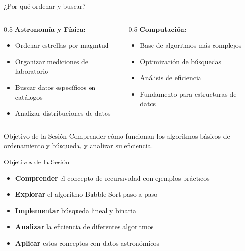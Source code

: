 \documentclass[10pt]{beamer}
\begin{document}
\begin{frame}{¿Por qué ordenar y buscar?}
  \begin{columns}
    \begin{column}{0.5\textwidth}
      \textbf{Astronomía y Física:}
      \begin{itemize}
        \item Ordenar estrellas por magnitud
        \item Organizar mediciones de laboratorio
        \item Buscar datos específicos en catálogos
        \item Analizar distribuciones de datos
      \end{itemize}
    \end{column}
    \begin{column}{0.5\textwidth}
      \textbf{Computación:}
      \begin{itemize}
        \item Base de algoritmos más complejos
        \item Optimización de búsquedas
        \item Análisis de eficiencia
        \item Fundamento para estructuras de datos
      \end{itemize}
    \end{column}
  \end{columns}
  
  \vspace{0.5cm}
  \begin{alertblock}{Objetivo de la Sesión}
    Comprender cómo funcionan los algoritmos básicos de ordenamiento y búsqueda, 
    y analizar su eficiencia.
  \end{alertblock}
\end{frame}

\begin{frame}{Objetivos de la Sesión}
  \begin{itemize}
    \item \textbf{Comprender} el concepto de recursividad con ejemplos prácticos
    \item \textbf{Explorar} el algoritmo Bubble Sort paso a paso
    \item \textbf{Implementar} búsqueda lineal y binaria
    \item \textbf{Analizar} la eficiencia de diferentes algoritmos
    \item \textbf{Aplicar} estos conceptos con datos astronómicos
  \end{itemize}
\end{frame}
\end{document}
